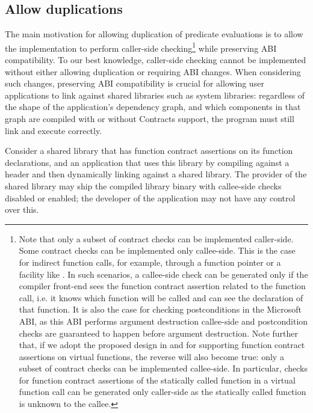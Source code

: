 \subsection{Allow duplications}
\label{subsec:ville}

The main motivation for allowing duplication of predicate evaluations is to allow the implementation to perform caller-side checking\footnote{Note that only a subset of contract checks can be implemented caller-side. Some contract checks can be implemented only callee-side. This is the case for indirect function calls, for example, through a function pointer or a facility like . In such scenarios, a callee-side check can be generated only if the compiler front-end sees the function contract assertion related to the function call, i.e. it knows which function will be called and can see the declaration of that function. It is also the case for checking postconditions in the Microsoft ABI, as this ABI performs argument destruction callee-side and postcondition checks are guaranteed to happen before argument destruction. Note further that, if we adopt the proposed design in \cite{P3097R0} and \cite{P3165R0} for supporting function contract assertions on virtual functions, the reverse will also become true: only a subset of contract checks can be implemented callee-side. In particular, checks for function contract assertions of the statically called function in a virtual function call can be generated only caller-side as the statically called function is unknown to the callee.} while preserving ABI compatibility. To our best knowledge, caller-side checking cannot be implemented without either allowing duplication or requiring ABI changes. When considering such changes, preserving ABI compatibility is crucial for allowing user applications to link against shared libraries such as system libraries: regardless of the shape of the application's dependency graph, and which components in that graph are compiled with or without Contracts support, the program must still link and execute correctly.

Consider a shared library that has function contract assertions on its function declarations, and an application that uses this library by compiling against a header and then dynamically linking against a shared library. The provider of the shared library may ship the compiled library binary with callee-side checks disabled or enabled; the developer of the application may not have any control over this.

